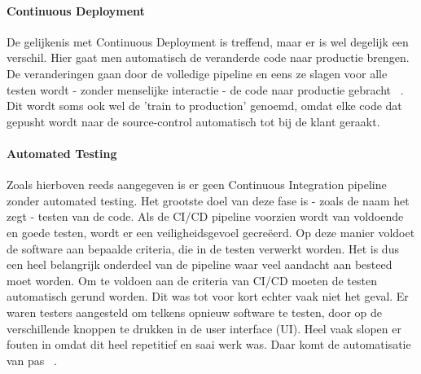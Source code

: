     \paragraph{Continuous Deployment}
    De gelijkenis met Continuous Deployment is treffend, maar er is wel degelijk een verschil.
    Hier gaat men automatisch de veranderde code naar productie brengen. De veranderingen gaan door de volledige pipeline en eens ze slagen voor alle testen wordt - zonder menselijke interactie - de code naar productie gebracht ~\autocite{Claps2015}.
    Dit wordt soms ook wel de 'train to production' genoemd, omdat elke code dat gepusht wordt naar de source-control automatisch tot bij de klant geraakt.
    
    \paragraph{Automated Testing}
    Zoals hierboven reeds aangegeven is er geen Continuous Integration pipeline zonder automated testing. Het grootste doel van deze fase is - zoals de naam het zegt - testen van de code. Als de CI/CD pipeline voorzien wordt van voldoende en goede testen, wordt er een veiligheidsgevoel gecreëerd. Op deze manier voldoet de software aan bepaalde criteria, die in de testen verwerkt worden. Het is dus een heel belangrijk onderdeel van de pipeline waar veel aandacht aan besteed moet worden. 
    Om te voldoen aan de criteria van CI/CD moeten de testen automatisch gerund worden. Dit was tot voor kort echter vaak niet het geval. Er waren testers aangesteld om telkens opnieuw software te testen, door op de verschillende knoppen te drukken in de user interface (UI). Heel vaak slopen er fouten in omdat dit heel repetitief en saai werk was. Daar komt de automatisatie van pas ~\autocite{Vocke2018}.
    
